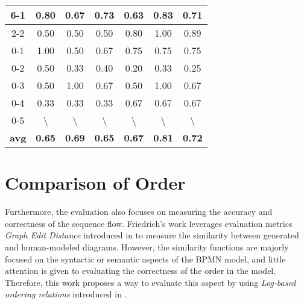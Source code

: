 \begin{table}[]
\begin{tabular}{|c|c|c|c|c|c|c|}
6-1          & 0.80             & 0.67             & 0.73             & 0.63             & 0.83             & 0.71             \\ \hline
2-2          & 0.50             & 0.50             & 0.50             & 0.80             & 1.00             & 0.89             \\ \hline
0-1          & 1.00             & 0.50             & 0.67             & 0.75             & 0.75             & 0.75             \\ \hline
0-2          & 0.50             & 0.33             & 0.40             & 0.20             & 0.33             & 0.25             \\ \hline
0-3          & 0.50             & 1.00             & 0.67             & 0.50             & 1.00             & 0.67             \\ \hline
0-4          & 0.33             & 0.33             & 0.33             & 0.67             & 0.67             & 0.67             \\ \hline
0-5          & \textbackslash{} & \textbackslash{} & \textbackslash{} & \textbackslash{} & \textbackslash{} & \textbackslash{} \\ \hline
\textbf{avg} & \textbf{0.65}    & \textbf{0.69}    & \textbf{0.65}    & \textbf{0.67}    & \textbf{0.81}    & \textbf{0.72}    \\ \hline
\end{tabular}
\end{table}













\section{Comparison of Order}
Furthermore, the evaluation also focuses on measuring the accuracy and correctness of the sequence flow. Friedrich's work leverages evaluation metrics \textit{Graph Edit Distance} introduced in \cite{eva_01} to measure the similarity between generated and human-modeled diagrams. However, the similarity functions are majorly focused on the syntactic or semantic aspects of the BPMN model, and little attention is given to evaluating the correctness of the order in the model. Therefore, this work proposes a way to evaluate this aspect by using \textit{Log-based ordering relations} introduced in \cite{eva_02}. 

